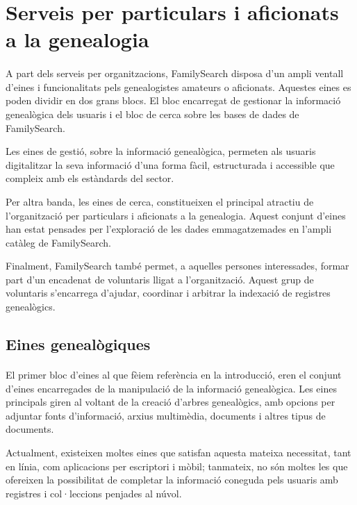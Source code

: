 \section{Serveis per particulars i aficionats a la genealogia}

    \paragraph{}
    A part dels serveis per organitzacions, FamilySearch disposa d'un ampli ventall d'eines i funcionalitats pels genealogistes amateurs o aficionats. Aquestes eines es poden dividir en dos grans blocs. El bloc encarregat de gestionar la informació genealògica dels usuaris i el bloc de cerca sobre les bases de dades de FamilySearch.

    Les eines de gestió, sobre la informació genealògica, permeten als usuaris digitalitzar la seva informació d'una forma fàcil, estructurada i accessible que compleix amb els estàndards del sector.

    Per altra banda, les eines de cerca, constitueixen el principal atractiu de l’organització per particulars i aficionats a la genealogia. Aquest conjunt d'eines han estat pensades per l’exploració de les dades emmagatzemades en l'ampli catàleg de FamilySearch.

    Finalment, FamilySearch també permet, a aquelles persones interessades, formar part d'un encadenat de voluntaris lligat a l'organització. Aquest grup de voluntaris s'encarrega d'ajudar, coordinar i arbitrar la indexació de registres genealògics.


    \subsection{Eines genealògiques}

    \paragraph{}
    El primer bloc d'eines al que fèiem referència en la introducció, eren el conjunt d'eines encarregades de la manipulació de la informació genealògica. Les eines principals giren al voltant de la creació d’arbres genealògics, amb opcions per adjuntar fonts d’informació, arxius multimèdia, documents i altres tipus de documents.

    Actualment, existeixen moltes eines que satisfan aquesta mateixa necessitat, tant en línia, com aplicacions per escriptori i mòbil; tanmateix, no són moltes les que ofereixen la possibilitat de completar la informació coneguda pels usuaris amb registres i col·leccions penjades al núvol.

